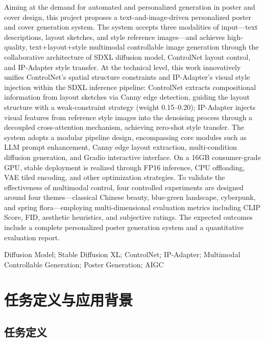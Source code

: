 \documentclass[10pt,a4paper]{article}
\begin{document}
Aiming at the demand for automated and personalized generation in poster and cover design, this project proposes a text-and-image-driven personalized poster and cover generation system. The system accepts three modalities of input—text descriptions, layout sketches, and style reference images—and achieves high-quality, text+layout+style multimodal controllable image generation through the collaborative architecture of SDXL diffusion model, ControlNet layout control, and IP-Adapter style transfer. At the technical level, this work innovatively unifies ControlNet's spatial structure constraints and IP-Adapter's visual style injection within the SDXL inference pipeline: ControlNet extracts compositional information from layout sketches via Canny edge detection, guiding the layout structure with a weak-constraint strategy (weight 0.15--0.20); IP-Adapter injects visual features from reference style images into the denoising process through a decoupled cross-attention mechanism, achieving zero-shot style transfer. The system adopts a modular pipeline design, encompassing core modules such as LLM prompt enhancement, Canny edge layout extraction, multi-condition diffusion generation, and Gradio interactive interface. On a 16GB consumer-grade GPU, stable deployment is realized through FP16 inference, CPU offloading, VAE tiled encoding, and other optimization strategies. To validate the effectiveness of multimodal control, four controlled experiments are designed around four themes—classical Chinese beauty, blue-green landscape, cyberpunk, and spring flora—employing multi-dimensional evaluation metrics including CLIP Score, FID, aesthetic heuristics, and subjective ratings. The expected outcomes include a complete personalized poster generation system and a quantitative evaluation report.

\vspace{8pt}
 Diffusion Model; Stable Diffusion XL; ControlNet; IP-Adapter; Multimodal Controllable Generation; Poster Generation; AIGC

\newpage

\section{任务定义与应用背景}

\subsection{任务定义}
\end{document}
